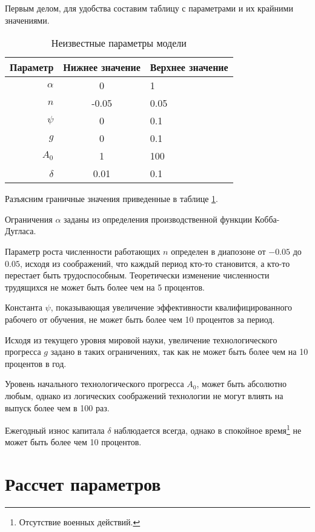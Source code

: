 Первым делом, для удобства составим таблицу с параметрами и их крайними значениями.
\begin{table}[ht]
	\centering
	\caption{Неизвестные параметры модели}
	\label{tab:parameters}
	\begin{tabular}{|r|c|l|}
	\hline
	Параметр & Нижнее значение & Верхнее значение \\ \hline
	$\alpha$ &      0          &      1           \\
	$n$      &      -0.05      &      0.05        \\
	$\psi$   &      0          &      0.1         \\
	$g$      &      0          &      0.1         \\
	$A_0$    &      1          &      100         \\
	$\delta$ &      0.01       &    0.1           \\ \hline
	\end{tabular}%
\end{table}
Разъясним граничные значения приведенные в таблице \ref{tab:parameters}.

Ограничения $\alpha$ заданы из определения производственной функции Кобба-Дугласа.

Параметр роста численности работающих $n$ определен в диапозоне от $-0.05$ до $0.05$, исходя из соображений, что каждый период кто-то становится, а кто-то перестает быть трудоспособным.
Теоретически изменение численности трудящихся не может быть более чем на 5 процентов.

Константа $\psi$, показывающая увеличение эффективности квалифицированного рабочего от обучения, не может быть более чем 10 процентов за период.

Исходя из текущего уровня мировой науки, увеличение технологического прогресса $g$ задано в таких ограничениях, так как не может быть более чем на 10 процентов в год.

Уровень начального технологического прогресса $A_0$, может быть абсолютно любым, однако из логических соображений технологии не могут влиять на выпуск более чем в 100 раз.

Ежегодный износ капитала $\delta$ наблюдается всегда, однако в спокойное время\footnote{Отсутствие военных действий.} не может быть более чем 10 процентов.

\section{Рассчет параметров}

